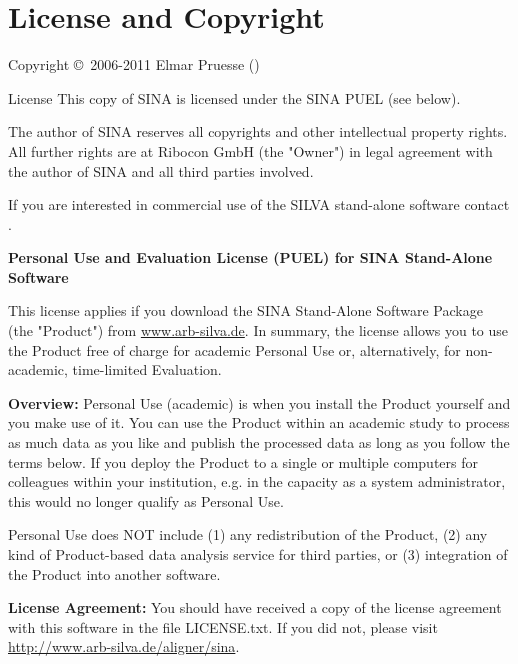 \documentclass[english,a4paper]{article}
\renewcommand{\URL}[1]{\url{#1}}
\begin{document}
\section{License and Copyright}
\begin{Description}
\item[Copyright \copyright\ 2006-2011] Elmar Pruesse ()
\item[License] This copy of SINA is licensed under the SINA PUEL (see below).

The author of SINA reserves all copyrights and other intellectual property rights. All further rights are at Ribocon GmbH (the "Owner") in legal agreement with the author of SINA and all third parties involved.

If you are interested in commercial use of the SILVA stand-alone software contact .

\textbf{Personal Use and Evaluation License (PUEL) for SINA Stand-Alone Software}

This license applies if you download the SINA Stand-Alone Software Package (the "Product") from \URL{www.arb-silva.de}. In summary, the license allows you to use the Product free of charge for academic Personal Use or, alternatively, for non-academic, time-limited Evaluation. 

\textbf{Overview:}
Personal Use (academic) is when you install the Product yourself and you make use of it. You can use the Product within an academic study to process as much data as you like and publish the processed data as long as you follow the terms below. If you deploy the Product to a single or multiple computers for colleagues within your institution, e.g. in the capacity as a system administrator, this would no longer qualify as Personal Use.

Personal Use does NOT include (1) any redistribution of the Product, (2) any kind of Product-based data analysis service for third parties, or (3) integration of the Product into another software. 

\textbf{License Agreement:}
You should have received a copy of the license agreement with this software in the file LICENSE.txt. If you did not, please
visit \URL{http://www.arb-silva.de/aligner/sina}.

\end{Description}
\LatexManEnd
\end{document}
